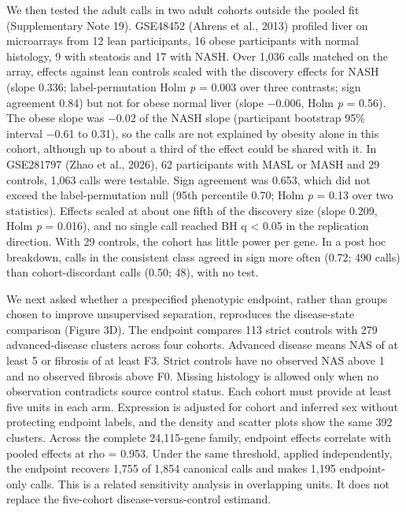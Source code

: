 We then tested the adult calls in two adult cohorts outside the pooled fit (Supplementary Note 19). GSE48452 (Ahrens et al., 2013) profiled liver on microarrays from 12 lean participants, 16 obese participants with normal histology, 9 with steatosis and 17 with NASH. Over 1,036 calls matched on the array, effects against lean controls scaled with the discovery effects for NASH (slope 0.336; label-permutation Holm \emph{p} = 0.003 over three contrasts; sign agreement 0.84) but not for obese normal liver (slope −0.006, Holm \emph{p} = 0.56). The obese slope was −0.02 of the NASH slope (participant bootstrap 95\% interval −0.61 to 0.31), so the calls are not explained by obesity alone in this cohort, although up to about a third of the effect could be shared with it. In GSE281797 (Zhao et al., 2026), 62 participants with MASL or MASH and 29 controls, 1,063 calls were testable. Sign agreement was 0.653, which did not exceed the label-permutation null (95th percentile 0.70; Holm \emph{p} = 0.13 over two statistics). Effects scaled at about one fifth of the discovery size (slope 0.209, Holm \emph{p} = 0.016), and no single call reached BH q \textless{} 0.05 in the replication direction. With 29 controls, the cohort has little power per gene. In a post hoc breakdown, calls in the consistent class agreed in sign more often (0.72; 490 calls) than cohort-discordant calls (0.50; 48), with no test.

We next asked whether a prespecified phenotypic endpoint, rather than groups chosen to improve unsupervised separation, reproduces the disease-state comparison (Figure 3D). The endpoint compares 113 strict controls with 279 advanced-disease clusters across four cohorts. Advanced disease means NAS of at least 5 or fibrosis of at least F3. Strict controls have no observed NAS above 1 and no observed fibrosis above F0. Missing histology is allowed only when no observation contradicts source control status. Each cohort must provide at least five units in each arm. Expression is adjusted for cohort and inferred sex without protecting endpoint labels, and the density and scatter plots show the same 392 clusters. Across the complete 24,115-gene family, endpoint effects correlate with pooled effects at rho = 0.953. Under the same threshold, applied independently, the endpoint recovers 1,755 of 1,854 canonical calls and makes 1,195 endpoint-only calls. This is a related sensitivity analysis in overlapping units. It does not replace the five-cohort disease-versus-control estimand.

